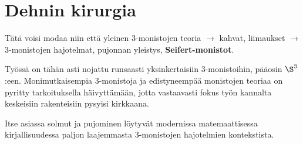 \section{Dehnin kirurgia}
Tätä voisi modaa niin että yleinen 3-monistojen teoria $\rightarrow$ kahvat, liimaukset $\rightarrow$ 3-monistojen hajotelmat, pujonnan yleistys, \textbf{Seifert-monistot}.

Työssä on tähän asti nojattu runsaasti yksinkertaisiin 3-monistoihin, pääosin $\S^3$:een. Monimutkaisempia 3-monistoja ja edistyneempää monistojen teoriaa on pyritty tarkoituksella häivyttämään, jotta vastaavasti fokus työn kannalta keskeisiin rakenteisiin pysyisi kirkkaana.

Itse asiassa solmut ja pujominen löytyvät modernissa matemaattisessa kirjallisuudessa paljon laajemmasta 3-monistojen hajotelmien kontekstista. 
